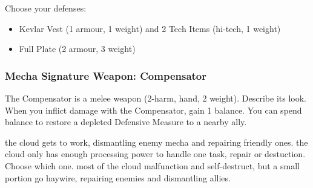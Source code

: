 Choose your defenses:
\begin{itemize}
\item Kevlar Vest (1 armour, 1 weight) and 2 Tech Items (hi-tech, 1 weight)
\item Full Plate (2 armour, 3 weight)
\end{itemize}

\subsubsection{Mecha Signature Weapon: Compensator}
The Compensator is a melee weapon (2-harm, hand, 2 weight). Describe its look.
When you inflict damage with the Compensator, gain 1 balance. You can spend balance to restore a depleted Defensive Measure to a nearby ally.

{the cloud gets to work, dismantling enemy mecha and repairing friendly ones.}
{the cloud only has enough processing power to handle one task, repair or destuction. Choose which one.}
{most of the cloud malfunction and self-destruct, but a small portion go haywire, repairing enemies and dismantling allies.}

